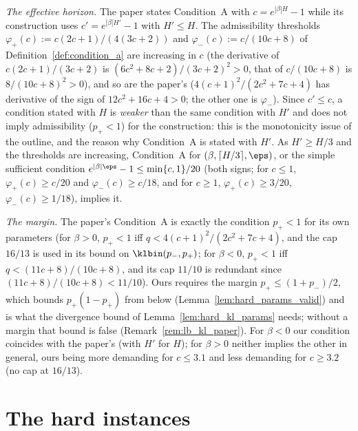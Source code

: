 \begin{remark}[On Condition~A]\label{rem:lb_condition_a}
\emph{The effective horizon.} The paper states Condition~A with $c = e^{|\beta|H} - 1$ while its
construction uses $c' = e^{|\beta|H'} - 1$ with $H' \le H$. The admissibility thresholds
$\varphi_+(c) := c(2c+1)/(4(3c+2))$ and $\varphi_-(c) := c/(10c+8)$ of
Definition~\ref{def:condition_a} are increasing in $c$ (the derivative of $c(2c+1)/(3c+2)$ is
$(6c^2 + 8c + 2)/(3c+2)^2 > 0$, that of $c/(10c+8)$ is $8/(10c+8)^2 > 0$), and so are the
paper's ($4(c+1)^2/(2c^2+7c+4)$ has derivative of the sign of $12c^2 + 16c + 4 > 0$; the other
one is $\varphi_-$). Since $c' \le c$, a condition stated with $H$ is \emph{weaker} than the same
condition with $H'$ and does not imply admissibility ($p_+ < 1$) for the construction: this is
the monotonicity issue of the outline, and the reason why Condition~A is stated with $H'$. As
$H' \ge H/3$ and the thresholds are increasing, Condition~A for $(\beta, \lceil H/3 \rceil, \eps)$,
or the simple sufficient condition $e^{|\beta|\eps} - 1 \le \min\{c, 1\}/20$ (both signs; for
$c \le 1$, $\varphi_+(c) \ge c/20$ and $\varphi_-(c) \ge c/18$, and for $c \ge 1$,
$\varphi_+(c) \ge 3/20$, $\varphi_-(c) \ge 1/18$), implies it.

\emph{The margin.} The paper's Condition~A is exactly the condition $p_+ < 1$ for its own
parameters (for $\beta > 0$, $p_+ < 1$ iff $q < 4(c+1)^2/(2c^2+7c+4)$, and the cap $16/13$ is used
in its bound on $\klbin(p_-,p_+)$; for $\beta < 0$, $p_+ < 1$ iff $q < (11c+8)/(10c+8)$, and its
cap $11/10$ is redundant since $(11c+8)/(10c+8) < 11/10$). Ours requires the margin
$p_+ \le (1 + p_-)/2$, which bounds $p_+(1 - p_+)$ from below (Lemma~\ref{lem:hard_params_valid})
and is what the divergence bound of Lemma~\ref{lem:hard_kl_params} needs; without a margin that
bound is false (Remark~\ref{rem:lb_kl_paper}). For $\beta < 0$ our condition coincides with the
paper's (with $H'$ for $H$); for $\beta > 0$ neither implies the other in general, ours being
more demanding for $c \le 3.1$ and less demanding for $c \ge 3.2$ (no cap at $16/13$).
\end{remark}

\section{The hard instances}
\label{sec:lb_instances}

